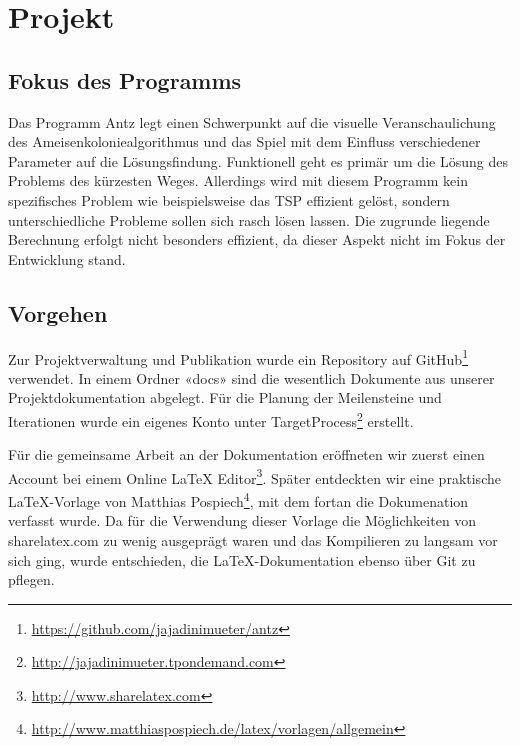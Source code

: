 

\chapter{Projekt}



\section{Fokus des Programms}

Das Programm Antz legt einen Schwerpunkt auf die visuelle Veranschaulichung des
Ameisenkoloniealgorithmus und das Spiel mit dem Einfluss verschiedener Parameter
auf die Lösungsfindung. Funktionell geht es primär um die Lösung des Problems
des kürzesten Weges. Allerdings wird mit diesem Programm kein spezifisches
Problem wie beispielsweise das TSP effizient gelöst, sondern unterschiedliche
Probleme sollen sich rasch lösen lassen. Die zugrunde liegende Berechnung
erfolgt nicht besonders effizient, da dieser Aspekt nicht im Fokus der
Entwicklung stand.





\section{Vorgehen}

Zur Projektverwaltung und Publikation wurde ein Repository auf
GitHub\footnote{\url{https://github.com/jajadinimueter/antz}} verwendet. In
einem Ordner «docs» sind die wesentlich Dokumente aus unserer
Projektdokumentation abgelegt. Für die Planung der Meilensteine und Iterationen
wurde ein eigenes Konto unter
TargetProcess\footnote{\url{http://jajadinimueter.tpondemand.com}} erstellt.

Für die gemeinsame Arbeit an der Dokumentation eröffneten wir zuerst einen
Account bei einem Online LaTeX Editor\footnote{\url{http://www.sharelatex.com}}.
Später entdeckten wir eine praktische LaTeX-Vorlage von Matthias
Pospiech\footnote{\url{http://www.matthiaspospiech.de/latex/vorlagen/allgemein}},
mit dem fortan die Dokumenation verfasst wurde. Da für die Verwendung dieser
Vorlage die Möglichkeiten von sharelatex.com zu wenig ausgeprägt waren und das
Kompilieren zu langsam vor sich ging, wurde entschieden, die LaTeX-Dokumentation
ebenso über Git zu pflegen.

